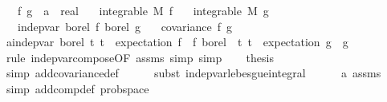 \begin{isabellebody}
\ \ \ f\ g\ {\isacharcolon}{\kern0pt}{\isacharcolon}{\kern0pt}\ {\isachardoublequoteopen}{\isacharprime}{\kern0pt}a\ {\isasymRightarrow}\ real{\isachardoublequoteclose}\isanewline
\ \ \ {\isachardoublequoteopen}integrable\ M\ f{\isachardoublequoteclose}\isanewline
\ \ \ {\isachardoublequoteopen}integrable\ M\ g{\isachardoublequoteclose}\isanewline
\ \ \ {\isachardoublequoteopen}indep{\isacharunderscore}{\kern0pt}var\ borel\ f\ borel\ g{\isachardoublequoteclose}\isanewline
\ \ \ {\isachardoublequoteopen}covariance\ f\ g\ {\isacharequal}{\kern0pt}\ {}{\isachardoublequoteclose}\isanewline
%
\isadelimproof
%
\endisadelimproof
%
\isatagproof
{}\isamarkupfalse%
\ {\isacharminus}{\kern0pt}\isanewline
\ \ \isamarkupfalse%
\ a{\isacharcolon}{\kern0pt}{\isachardoublequoteopen}indep{\isacharunderscore}{\kern0pt}var\ borel\ {\isacharparenleft}{\kern0pt}{\isacharparenleft}{\kern0pt}{\isasymlambda}t{\isachardot}{\kern0pt}\ t\ {\isacharminus}{\kern0pt}\ expectation\ f{\isacharparenright}{\kern0pt}\ {\isasymcirc}\ f{\isacharparenright}{\kern0pt}\ borel\ \ {\isacharparenleft}{\kern0pt}{\isacharparenleft}{\kern0pt}{\isasymlambda}t{\isachardot}{\kern0pt}\ t\ {\isacharminus}{\kern0pt}\ expectation\ g{\isacharparenright}{\kern0pt}\ {\isasymcirc}\ g{\isacharparenright}{\kern0pt}{\isachardoublequoteclose}\isanewline
\ \ \ \ \isamarkupfalse%
\ {\isacharparenleft}{\kern0pt}rule\ indep{\isacharunderscore}{\kern0pt}var{\isacharunderscore}{\kern0pt}compose{\isacharbrackleft}{\kern0pt}OF\ assms{\isacharparenleft}{\kern0pt}{}{\isacharparenright}{\kern0pt}{\isacharbrackright}{\kern0pt}{\isacharcomma}{\kern0pt}\ simp{\isacharcomma}{\kern0pt}\ simp{\isacharparenright}{\kern0pt}\isanewline
\isanewline
\ \ \isamarkupfalse%
\ {\isacharquery}{\kern0pt}thesis\isanewline
\ \ \ \ \isamarkupfalse%
\ {\isacharparenleft}{\kern0pt}simp\ add{\isacharcolon}{\kern0pt}covariance{\isacharunderscore}{\kern0pt}def{\isacharparenright}{\kern0pt}\isanewline
\ \ \ \ \isamarkupfalse%
\ {\isacharparenleft}{\kern0pt}subst\ indep{\isacharunderscore}{\kern0pt}var{\isacharunderscore}{\kern0pt}lebesgue{\isacharunderscore}{\kern0pt}integral{\isacharparenright}{\kern0pt}\isanewline
\ \ \ \ \isamarkupfalse%
\ a\ assms\ \isamarkupfalse%
\ {\isacharparenleft}{\kern0pt}simp\ add{\isacharcolon}{\kern0pt}comp{\isacharunderscore}{\kern0pt}def\ prob{\isacharunderscore}{\kern0pt}space{\isacharparenright}{\kern0pt}{\isacharplus}{\kern0pt}\isanewline

\end{isabellebody}
